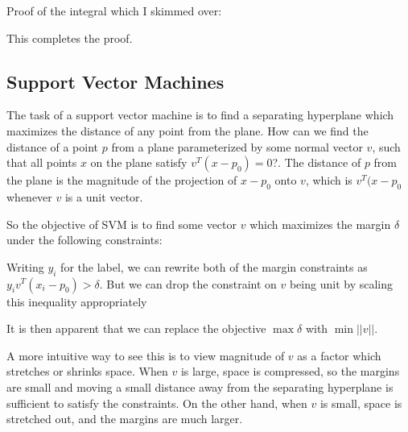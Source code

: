 \documentclass[12pt]{article}
\begin{document}
Proof of the integral which I skimmed over:


This completes the proof.

\subsection{Support Vector Machines}

The task of a support vector machine is to find a separating hyperplane which maximizes the distance of any point from the plane. How can we find the distance of a point $p$ from a plane parameterized by some normal vector $v$, such that all points $x$ on the plane satisfy $v^T(x-p_0) = 0$?. The distance of $p$ from the plane is the magnitude of the projection of $x-p_0$ onto $v$, which is $v^T(x-p_0$ whenever $v$ is a unit vector.

So the objective of SVM is to find some vector $v$ which maximizes the margin $\delta$ under the following constraints:


Writing $y_i$ for the label, we can rewrite both of the margin constraints as $y_i v^T(x_i -p_0) > \delta$. But we can drop the constraint on $v$ being unit by scaling this inequality appropriately


It is then apparent that we can replace the objective $\max \delta$ with $\min ||v||$.

A more intuitive way to see this is to view magnitude of $v$ as a factor which stretches or shrinks space. When $v$ is large, space is compressed, so the margins are small and moving a small distance away from the separating hyperplane is sufficient to satisfy the constraints. On the other hand, when $v$ is small, space is stretched out, and the margins are much larger.
\end{document}

